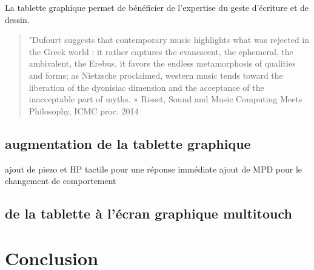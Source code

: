 La tablette graphique permet de bénéficier de l’expertise du geste d’écriture et de dessin.

\begin{quote}
"Dufourt suggests that contemporary music highlights what was rejected in the Greek world : it rather captures the evanescent, the ephemeral, the ambivalent, the Erebus, it favors the endless metamorphosis of qualities and forms; as Nietzsche proclaimed, western music tends toward the liberation of the dyonisiac dimension and the acceptance of the inacceptable part of myths. » Risset, Sound and Music Computing Meets Philosophy, ICMC proc. 2014
\end{quote}

\subsection{augmentation de la tablette graphique}
ajout de piezo et HP tactile pour une réponse immédiate
ajout de MPD pour le changement de comportement

\subsection{de la tablette à l'écran graphique multitouch}


\section{Conclusion}
\label{sec:interfaces:conclusion}
